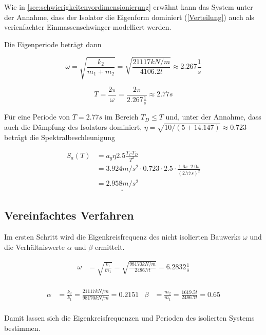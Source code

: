 Wie in \cref{sec:schwierigkeitenvordimensionierung} erwähnt kann das System unter der Annahme, dass der Isolator die Eigenform dominiert (\cref{Verteilung}) auch als verienfachter Einmassenschwinger modelliert werden.

Die Eigenperiode beträgt dann

\begin{equation*}
\omega = \sqrt{\frac{k_2}{m_1 + m_2}} = \sqrt{\frac{21117 kN/m}{4106.2 t}} \approx 2.267 \frac{1}{s}
\end{equation*}

\begin{equation*}
T = \frac{2 \pi}{\omega} = \frac{2 \pi}{2.267 \frac{1}{s}} \approx 2.77 s
\end{equation*}

Für eine Periode von $T = 2.77 s$ im Bereich $T_D \leq T$ und, unter der Annahme, dass auch die Dämpfung des Isolators dominiert, $\eta=\sqrt{10/(5+14.147)} \approx 0.723$ beträgt die Spektralbeschleunigung

\begin{align*}
S_a(T) &= a_g \eta 2.5 \frac{T_C T_D}{T^2}\\
       &= 3.924 m/s^2 \cdot 0.723 \cdot 2.5 \cdot \frac{1.6 s \cdot 2.0 s}{(2.77 s)^2}\\
       &= \underline{\underline{2.958 m/s^2}}
\end{align*}

\subsection{Vereinfachtes Verfahren}

Im ersten Schritt wird die Eigenkreisfrequenz des nicht isolierten Bauwerks $\omega$ und die Verhältniswerte $\alpha$ und $\beta$ ermittelt.

\begin{align*}
\omega &= \sqrt{\frac{k_1}{m_1}} = \sqrt{\frac{98170 kN/m}{2486.7 t}} = 6.2832 \frac{1}{s}\\
\end{align*}

\begin{align*}
\alpha &= \frac{k_2}{k_1} = \frac{21117 kN/m}{98170 kN/m} = 0.2151 & \beta  &= \frac{m_2}{m_1} = \frac{1619.5 t}{2486.7 t} = 0.65\\
\end{align*}

Damit lassen sich die Eigenkreisfrequenzen und Perioden des isolierten Systems bestimmen.

